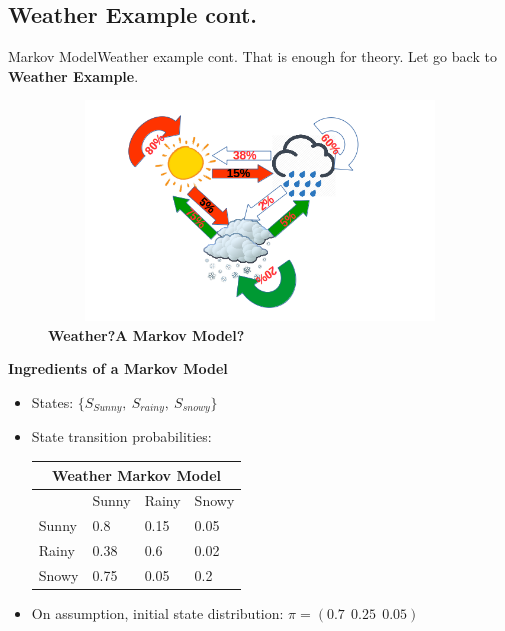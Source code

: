 \documentclass[10pt]{beamer}
\begin{document}
\subsection{Weather Example cont.}
\begin{frame}[allowframebreaks]{Markov Model}{Weather example cont.}
That is enough for theory. Let go back to \textbf{Weather Example}. 
  \begin{figure}[h]
    \centering
    \includegraphics[width=4.6in,height=2.3in]{figures/weather_example.png}
    \caption {\textbf{Weather?A Markov Model?}}
  \end{figure}
  \textbf{Ingredients of a Markov Model}
  \begin{itemize}
      \item States: $\{S_{Sunny},\ S_{rainy},\ S_{snowy}\}$
      \item State transition probabilities:
            \begin{center}
              \begin{tabular}{ |p{2cm}|p{1.2cm}|p{1.2cm}|p{1.2cm}| }
                \hline
                 \multicolumn{4}{|c|}{Weather Markov Model} \\
                \hline
                        & Sunny & Rainy & Snowy \\
                \hline
                     Sunny & 0.8  & 0.15 & 0.05\\
                     Rainy & 0.38 & 0.6  & 0.02\\
                     Snowy & 0.75 & 0.05 & 0.2\\
                \hline
              \end{tabular}
              \end{center}
      \item On assumption, initial state distribution: $\pi = (0.7\ \ 0.25\ \ 0.05)$
  \end{itemize}
  \begin{figure}[h]

\end{figure}
\end{frame}
\end{document}
